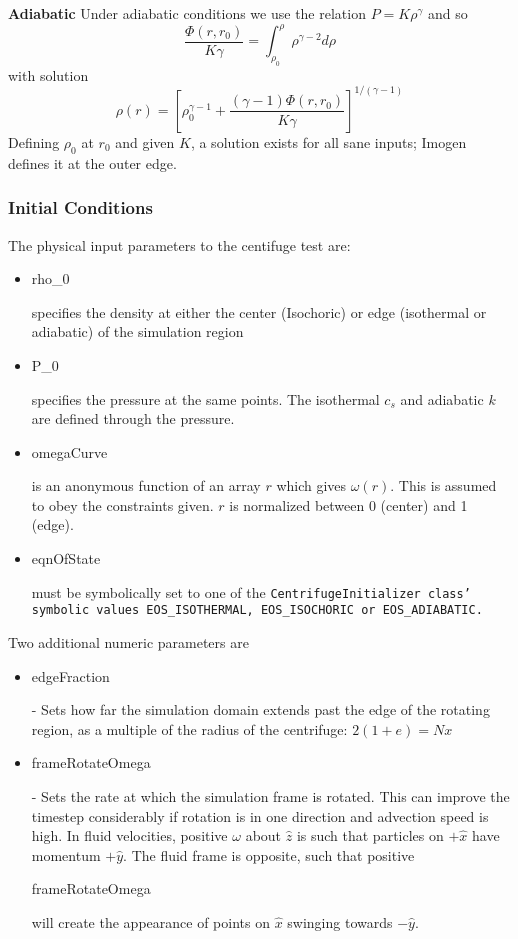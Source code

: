 \textbf{Adiabatic}
Under adiabatic conditions we use the relation $P = K \rho^\gamma$ and so
\[ \frac{\Phi(r,r_0)}{K \gamma} = \int_{\rho_0}^\rho \rho^{\gamma-2} d\rho \]
with solution
\[ \rho(r) = \left[ \rho_0^{\gamma-1} + \frac{(\gamma-1)\Phi(r,r_0)}{K \gamma} \right]^{1/(\gamma-1)} \]
Defining $\rho_0$ at $r_0$ and given $K$, a solution exists for all sane inputs; Imogen
defines it at the outer edge.

\subsubsection{Initial Conditions}

The physical input parameters to the centifuge test are:
\begin{itemize}
\item \begin{tt}rho\_0\end{tt} specifies the density at either the center (Isochoric) or edge (isothermal
or adiabatic) of the simulation region
\item \begin{tt}P\_0\end{tt} specifies the pressure at the same points. The isothermal $c_s$ and adiabatic $k$
are defined through the pressure.
\item \begin{tt}omegaCurve\end{tt} is an anonymous function of an array $r$ which gives $\omega(r)$. This is 
assumed to obey the constraints given. $r$ is normalized between 0 (center) and 1 (edge).
\item \begin{tt}eqnOfState\end{tt} must be symbolically set to one of the \tt{CentrifugeInitializer} class' 
symbolic values \tt{EOS\_ISOTHERMAL}, \tt{EOS\_ISOCHORIC} or \tt{EOS\_ADIABATIC}.
\end{itemize}

Two additional numeric parameters are
\begin{itemize}
\item \begin{tt}edgeFraction\end{tt} - Sets how far the simulation domain extends past the edge of the
rotating region, as a multiple of the radius of the centrifuge: $2(1+e) = Nx$
\item \begin{tt}frameRotateOmega\end{tt} - Sets the rate at which the simulation frame is rotated. This can improve the 
timestep considerably if rotation is in one direction and advection speed is high. In fluid velocities,
positive $\omega$ about $\hat{z}$ is such that particles on $+\hat{x}$ have momentum $+\hat{y}$. The fluid frame is opposite, such
that positive \begin{tt}frameRotateOmega\end{tt} will create the appearance of points on $\hat{x}$ swinging towards $-\hat{y}$.
\end{itemize}

